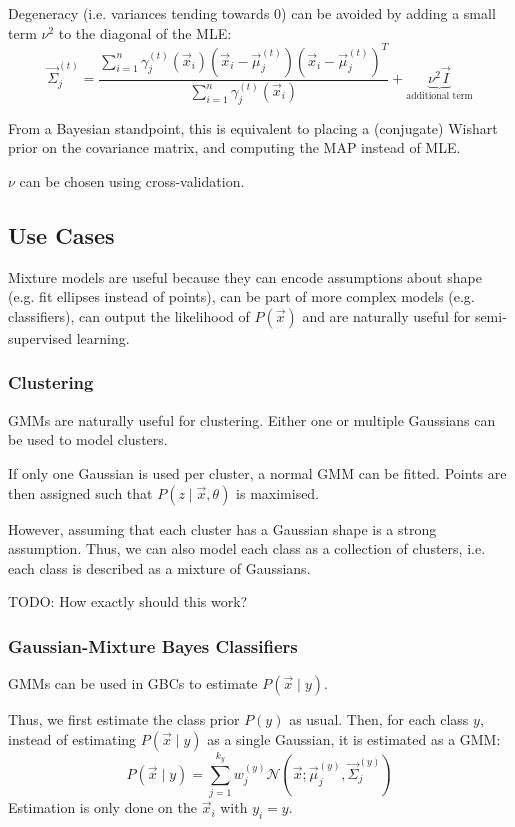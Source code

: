 Degeneracy (i.e. variances tending towards 0)
can be avoided by adding a small term $\nu^2$ to the
diagonal of the MLE:
\begin{equation*}
    \vec{\Sigma}^{(t)}_j = \frac{
    \sum_{i=1}^n{
    \gamma_j^{(t)}(\vec{x}_i) (\vec{x}_i - \vec{\mu}_j^{(t)}) (\vec{x}_i - \vec{\mu}_j^{(t)})^T
    }
    }{
        \sum_{i=1}^n{\gamma_j^{(t)}(\vec{x}_i)}
    }
    + \underbrace{\nu^2 \vec{I}}_\text{additional term}
\end{equation*}

From a Bayesian standpoint,
this is equivalent to placing a (conjugate) Wishart prior
on the covariance matrix,
and computing the MAP instead of MLE.

$\nu$ can be chosen using cross-validation.


\subsection{Use Cases}
Mixture models are useful because
they can encode assumptions about shape
(e.g. fit ellipses instead of points),
can be part of more complex models
(e.g. classifiers),
can output the likelihood of $P(\vec{x})$
and are naturally useful for semi-supervised
learning.

\subsubsection{Clustering}
GMMs are naturally useful for clustering.
Either one or multiple Gaussians can be
used to model clusters.

If only one Gaussian is used per cluster,
a normal GMM can be fitted.
Points are then assigned such that
$P(z \mid \vec{x}, \theta)$ is maximised.

However, assuming that each cluster has
a Gaussian shape is a strong assumption.
Thus, we can also model each class as
a collection of clusters,
i.e. each class is described as a
mixture of Gaussians.

TODO: How exactly should this work?

\subsubsection{Gaussian-Mixture Bayes Classifiers}
GMMs can be used in GBCs to estimate
$P(\vec{x} \mid y)$.

Thus, we first estimate the class prior
$P(y)$ as usual.
Then, for each class $y$,
instead of estimating
$P(\vec{x} \mid y)$ as a single Gaussian,
it is estimated as a GMM:
\begin{equation*}
    P(\vec{x} \mid y) = \sum_{j = 1}^{k_y}{
        w_j^{(y)}
        \mathcal{N}(\vec{x}; \vec{\mu}_j^{(y)}, \vec{\Sigma}_j^{(y)})
    }
\end{equation*}
Estimation is only done on the
$\vec{x}_i$ with $y_i = y$.

